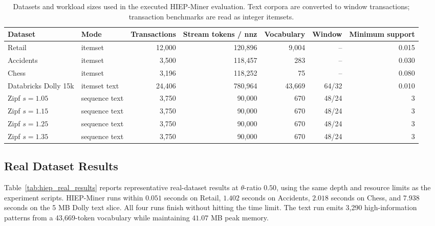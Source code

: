 \documentclass[11pt,a4paper]{article}
\begin{document}
\begin{table}[H]
\centering
\caption{Datasets and workload sizes used in the executed HIEP-Miner evaluation. Text corpora are converted to window transactions; transaction benchmarks are read as integer itemsets.}
\label{tab:hiep_workloads}
\small
\begin{adjustbox}{max width=\textwidth}
\begin{tabular}{llrrrrr}
\toprule
Dataset & Mode & Transactions & Stream tokens / nnz & Vocabulary & Window & Minimum support \\
\midrule
Retail & itemset & 12,000 & 120,896 & 9,004 & -- & 0.015 \\
Accidents & itemset & 3,500 & 118,457 & 283 & -- & 0.030 \\
Chess & itemset & 3,196 & 118,252 & 75 & -- & 0.080 \\
Databricks Dolly 15k & itemset text & 24,406 & 780,964 & 43,669 & 64/32 & 0.010 \\
Zipf \(s=1.05\) & sequence text & 3,750 & 90,000 & 670 & 48/24 & 3 \\
Zipf \(s=1.15\) & sequence text & 3,750 & 90,000 & 670 & 48/24 & 3 \\
Zipf \(s=1.25\) & sequence text & 3,750 & 90,000 & 670 & 48/24 & 3 \\
Zipf \(s=1.35\) & sequence text & 3,750 & 90,000 & 670 & 48/24 & 3 \\
\bottomrule
\end{tabular}
\end{adjustbox}
\end{table}

\subsection{Real Dataset Results}

Table~\ref{tab:hiep_real_results} reports representative real-dataset results at \(\theta\)-ratio \(0.50\), using the same depth and resource limits as the experiment scripts. HIEP-Miner runs within \(0.051\) seconds on Retail, \(1.402\) seconds on Accidents, \(2.018\) seconds on Chess, and \(7.938\) seconds on the 5 MB Dolly text slice. All four runs finish without hitting the time limit. The text run emits 3,290 high-information patterns from a 43,669-token vocabulary while maintaining \(41.07\) MB peak memory.
\end{document}
